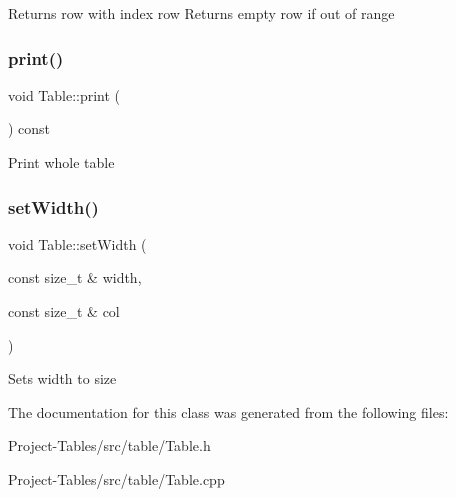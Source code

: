 Returns row with index row Returns empty row if out of range \mbox{\label{classTable_aa6531f07b1b9b1690ba81e6c27d7b47e}} 
\subsubsection{\texorpdfstring{print()}{print()}}
{\footnotesize\ttfamily void Table\+::print (\begin{DoxyParamCaption}{ }\end{DoxyParamCaption}) const}

Print whole table \mbox{\label{classTable_a25434e9c7466b30fd5274ae1e2b90340}} 
\subsubsection{\texorpdfstring{set\+Width()}{setWidth()}}
{\footnotesize\ttfamily void Table\+::set\+Width (\begin{DoxyParamCaption}\item[{const size\+\_\+t \&}]{width,  }\item[{const size\+\_\+t \&}]{col }\end{DoxyParamCaption})}

Sets width to size 

The documentation for this class was generated from the following files\+:\begin{DoxyCompactItemize}
\item 
Project-\/\+Tables/src/table/Table.\+h\item 
Project-\/\+Tables/src/table/Table.\+cpp\end{DoxyCompactItemize}
